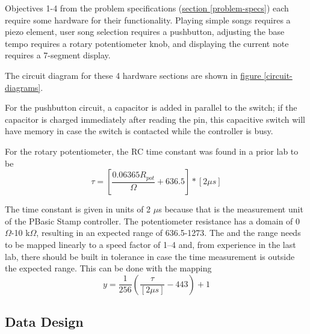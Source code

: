 \documentclass[11pt]{article}
\begin{document}
Objectives 1-4 from the problem specifications (\hyperref[problem-specs]{section \ref{problem-specs}})
each require some hardware for their functionality.
Playing simple songs requires a piezo element, user song selection requires a pushbutton,
adjusting the base tempo requires a rotary potentiometer knob, and
displaying the current note requires a 7-segment display.

The circuit diagram for these 4 hardware sections are shown in
\hyperref[circuit-diagrams]{figure \ref{circuit-diagrams}}. 

For the pushbutton circuit, a capacitor is added in parallel to the switch;
if the capacitor is charged immediately after reading the pin, this capacitive
switch will have memory in case the switch is contacted while the controller
is busy.

For the rotary potentiometer, the RC time constant was found in a prior lab to be
\begin{equation}
\tau = \left[ \frac{0.06365R_{pot}}{\Omega}+636.5 \right] *[2\mu s]
\end{equation}

The time constant is given in units of 2 $\mu$s because that is the measurement
unit of the PBasic Stamp controller. The potentiometer resistance has a domain
of 0 $\Omega$-10 k$\Omega$, resulting in an expected range of 636.5-1273.
The and the range needs to be mapped linearly to a
speed factor of 1--4 and, from experience in the last lab, there should be built in
tolerance in case the time measurement is outside the expected range.
This can be done with the mapping
\begin{equation}
y=\frac{1}{256}\left( \frac{\tau}{[2\mu s]}-443 \right) +1
\end{equation}

\subsection{Data Design}
\end{document}
